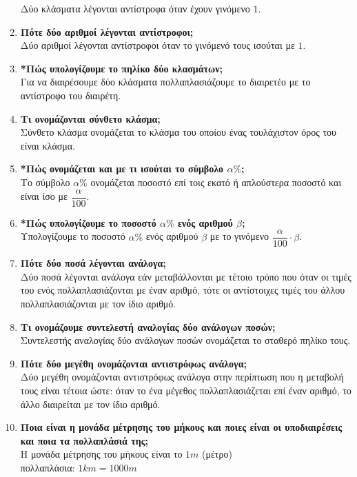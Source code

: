 \documentclass[a4paper,11pt]{report}
\begin{document}
\begin{enumerate}
      Δύο κλάσματα λέγονται αντίστροφα όταν έχουν γινόμενο $1$.
\item \textbf{Πότε δύο αριθμοί λέγονται αντίστροφοι;}\\
      Δύο αριθμοί λέγονται αντίστροφοι όταν το γινόμενό τους ισούται με $1$.
\item \textbf{*Πώς υπολογίζουμε το πηλίκο δύο κλασμάτων;}\\
      Για να διαιρέσουμε δύο κλάσματα πολλαπλασιάζουμε το διαιρετέο με το αντίστροφο του διαιρέτη.
\item \textbf{Τι ονομάζονται σύνθετο κλάσμα;}\\
     Σύνθετο κλάσμα ονομάζεται το κλάσμα του οποίου ένας τουλάχιστον όρος του είναι κλάσμα.
\item \textbf{*Πώς ονομάζεται και με τι ισούται το σύμβολο $α\%$;}\\
      Το σύμβολο $α\%$ ονομάζεται ποσοστό επί τοις εκατό ή απλούστερα ποσοστό και είναι ίσο με $\dfrac{α}{100}$.
\item \textbf{*Πώς υπολογίζουμε το ποσοστό $α\%$ ενός αριθμού $β$;}\\
      Υπολογίζουμε το ποσοστό $α\%$ ενός αριθμού $β$ με το γινόμενο $\dfrac{α}{100} \cdot β$.
\item \textbf{Πότε δύο ποσά λέγονται ανάλογα;}\\
       Δύο ποσά λέγονται ανάλογα εάν μεταβάλλονται με τέτοιο τρόπο που όταν οι τιμές του ενός πολλαπλασιάζονται 
       με έναν αριθμό, τότε οι αντίστοιχες τιμές του άλλου πολλαπλασιάζονται με τον ίδιο αριθμό.
\item \textbf{Τι ονομάζουμε συντελεστή αναλογίας δύο ανάλογων ποσών;}\\
      Συντελεστής αναλογίας δύο ανάλογων ποσών ονομάζεται το σταθερό πηλίκο τους.
\item \textbf{Πότε δύο μεγέθη ονομάζονται αντιστρόφως ανάλογα;}\\
       Δύο μεγέθη ονομάζονται αντιστρόφως ανάλογα στην περίπτωση που η μεταβολή τους είναι τέτοια ώστε:
       όταν το ένα μέγεθος πολλαπλασιάζεται επί έναν αριθμό, το άλλο διαιρείται με τον ίδιο αριθμό.
\item \textbf{Ποια είναι η μονάδα μέτρησης του μήκους και ποιες είναι οι υποδιαιρέσεις και ποια τα πολλαπλάσιά της;}\\
      Η μονάδα μέτρησης του μήκους είναι το $1m$ (μέτρο)\\
      πολλαπλάσια: $1km=1000m$\\

\end{enumerate}
\end{document}
